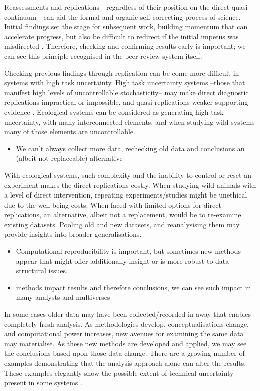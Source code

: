 \documentclass[10pt,a4paper]{article}
\providecommand{\tightlist}{%
  \setlength{\itemsep}{0pt}\setlength{\parskip}{0pt}}
\begin{document}
Reassessments and replications - regardless of their position on the direct-quasi continuum - can aid the formal and organic self-correcting process of science.
Initial findings set the stage for subsequent work, building momentum that can accelerate progress, but also be difficult to redirect if the initial impetus was misdirected .
Therefore, checking and confirming results early is important; we can see this principle recognised in the peer review system itself.

Checking previous findings through replication can be come more difficult in systems with high task uncertainty.
High task uncertainty systems --those that manifest high levels of uncontrollable stochasticity-- may make direct diagnostic replications impractical or impossible, and quasi-replications weaker supporting evidence .
Ecological systems can be considered as generating high task uncertainty, with many interconnected elements, and when studying wild systems many of those elements are uncontrollable.

\begin{itemize}
\tightlist
\item
  We can't always collect more data, rechecking old data and conclusions an (albeit not replaceable) alternative
\end{itemize}

With ecological systems, such complexity and the inability to control or reset an experiment makes the direct replications costly.
When studying wild animals with a level of direct intervention, repeating experiments/studies might be unethical due to the well-being costs.
When faced with limited options for direct replications, an alternative, albeit not a replacement, would be to re-examine existing datasets.
Pooling old and new datasets, and reanalysising them may provide insights into broader generalisations.

\begin{itemize}
\tightlist
\item
  Computational reproducibility is important, but sometimes new methods appear that might offer additionally insight or is more robust to data structural issues.
\item
  methods impact results and therefore conclusions, we can see such impact in many analysts and multiverses
\end{itemize}

In some cases older data may have been collected/recorded in away that enables completely fresh analysis.
As methodologies develop, conceptualisations change, and computational power increases, new avenues for examining the same data may materialise.
As these new methods are developed and applied, we may see the conclusions based upon those data change.
There are a growing number of examples demonstrating that the analysis approach alone can alter the results.
These examples elegantly show the possible extent of technical uncertainty present in some systems .
\end{document}
